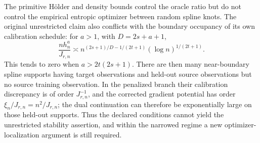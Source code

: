 The primitive Hölder and density bounds control the oracle ratio but do not control the empirical entropic optimizer between random spline knots. The original unrestricted claim also conflicts with the boundary occupancy of its own calibration schedule: for \(a>1\), with \(D=2s+a+1\),
\[
\frac{n h_n^a}{J_{r,n}}\asymp n^{(2s+1)/D-1/(2t+1)}(\log n)^{1/(2t+1)}.
\]
This tends to zero when \(a>2t(2s+1)\). There are then many near-boundary spline supports having target observations and held-out source observations but no source training observation. In the penalized branch their calibration discrepancy is of order \(J_{r,n}^{-1}\), and the corrected gradient potential has order \(\xi_n/J_{r,n}=n^2/J_{r,n}\); the dual continuation can therefore be exponentially large on those held-out supports. Thus the declared conditions cannot yield the unrestricted stability assertion, and within the narrowed regime a new optimizer-localization argument is still required.